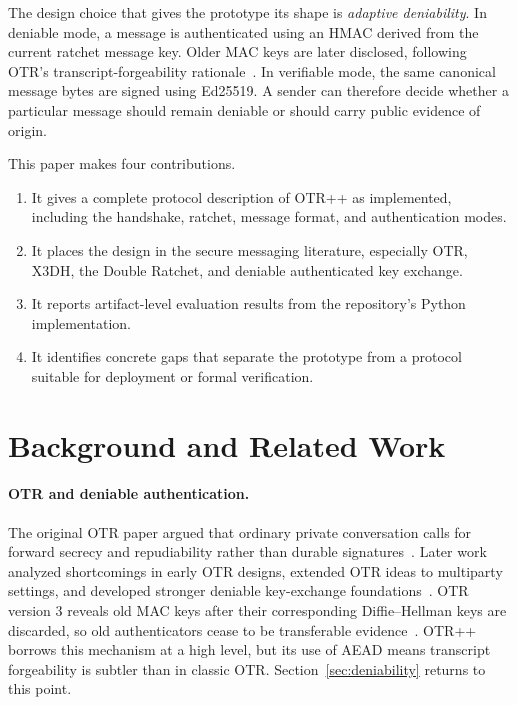 \documentclass[11pt]{article}
\newcommand{\prot}{OTR++}
\begin{document}
The design choice that gives the prototype its shape is \emph{adaptive deniability}. In deniable mode, a message is authenticated using an HMAC derived from the current ratchet message key. Older MAC keys are later disclosed, following OTR's transcript-forgeability rationale~\cite{otr_v3}. In verifiable mode, the same canonical message bytes are signed using Ed25519. A sender can therefore decide whether a particular message should remain deniable or should carry public evidence of origin.

This paper makes four contributions.

\begin{enumerate}
  \item It gives a complete protocol description of \prot{} as implemented, including the handshake, ratchet, message format, and authentication modes.
  \item It places the design in the secure messaging literature, especially OTR, X3DH, the Double Ratchet, and deniable authenticated key exchange.
  \item It reports artifact-level evaluation results from the repository's Python implementation.
  \item It identifies concrete gaps that separate the prototype from a protocol suitable for deployment or formal verification.
\end{enumerate}

\section{Background and Related Work}

\paragraph{OTR and deniable authentication.}
The original OTR paper argued that ordinary private conversation calls for forward secrecy and repudiability rather than durable signatures~\cite{borisov2004otr}. Later work analyzed shortcomings in early OTR designs, extended OTR ideas to multiparty settings, and developed stronger deniable key-exchange foundations~\cite{diraimondo2005secureotr,goldberg2009mpotr,diraimondo2006dake}. OTR version 3 reveals old MAC keys after their corresponding Diffie--Hellman keys are discarded, so old authenticators cease to be transferable evidence~\cite{otr_v3}. \prot{} borrows this mechanism at a high level, but its use of AEAD means transcript forgeability is subtler than in classic OTR. Section~\ref{sec:deniability} returns to this point.
\end{document}
